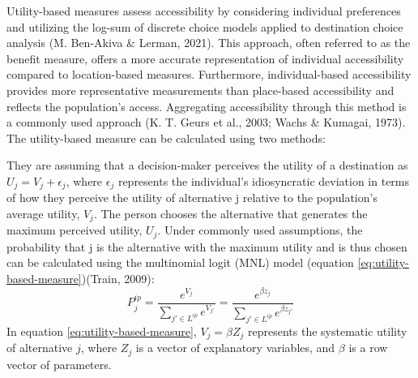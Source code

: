 \documentclass[12pt,twoside]{reedthesis}
\begin{document}
Utility-based measures assess accessibility by considering individual preferences and utilizing the log-sum of discrete choice models applied to destination choice analysis (M. Ben-Akiva \& Lerman, 2021). This approach, often referred to as the benefit measure, offers a more accurate representation of individual accessibility compared to location-based measures. Furthermore, individual-based accessibility provides more representative measurements than place-based accessibility and reflects the population's access. Aggregating accessibility through this method is a commonly used approach (K. T. Geurs et al., 2003; Wachs \& Kumagai, 1973). The utility-based measure can be calculated using two methods:

They are assuming that a decision-maker perceives the utility of a destination as \(U_j = V_j + \epsilon_j\), where \(\epsilon_j\) represents the individual's idiosyncratic deviation in terms of how they perceive the utility of alternative j relative to the population's average utility, \(V_j\). The person chooses the alternative that generates the maximum perceived utility, \(U_j\). Under commonly used assumptions, the probability that j is the alternative with the maximum utility and is thus chosen can be calculated using the multinomial logit (MNL) model (equation \eqref{eq:utility-based-measure})(Train, 2009):
\begin{equation}
P_j^{ip} = \frac{e^{V_j}}{\sum_{j' \in L^{ip}} e^{V_{j'}}} = \frac{e^{\beta z_j}}{\sum_{j' \in L^{ip}} e^{\beta z_{j'}}}
\label{eq:utility-based-measure}
\end{equation}
In equation \eqref{eq:utility-based-measure}, \({V_j} = \beta{Z_j}\) represents the systematic utility of alternative \(j\), where \({Z_j}\) is a vector of explanatory variables, and \(\beta\) is a row vector of parameters.
\end{document}
